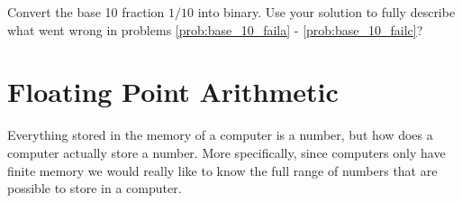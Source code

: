 % 

\begin{problem}
    Convert the base 10 fraction $1/10$ into binary.  Use your solution to fully describe
    what went wrong in problems \ref{prob:base_10_faila} - \ref{prob:base_10_failc}?
\end{problem}



\newpage\section{Floating Point Arithmetic}
Everything stored in the memory of a computer is a number, but how does a computer
actually store a number.  More specifically, since computers only have finite memory we
would really like to know the full range of numbers that are possible to store in a
computer.  


